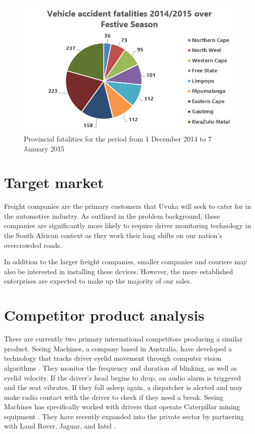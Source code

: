 \begin{figure}[H]
\centering
\includegraphics[width=1\textwidth]{images/provincial_fatalities.PNG}
\vskip10pt
\caption[Provincial fatalities for the period from 1 December 2014 to 7 January 2015]{Provincial fatalities for the period from 1 December 2014 to 7 January 2015}
\label{fig:festiveSeason}
\end{figure}

\section{Target market}
Freight companies are the primary customers that Uvuka will seek to cater for in the automotive industry. As outlined in the problem background, these companies are significantly more likely to require driver monitoring technology in the South African context as they work their long shifts on our nation's overcrowded roads.

In addition to the larger freight companies, smaller companies and couriers may also be interested in installing these devices. However, the more established enterprises are expected to make up the majority of our sales.

\section{Competitor product analysis}
\label{sec:competitoranalysis}
There are currently two primary international competitors producing a similar product. Seeing Machines, a company based in Australia, have developed a technology that tracks driver eyelid movement through computer vision algorithms \cite{SeeingMachinesWebsite}. They monitor the frequency and duration of blinking, as well as eyelid velocity. If the driver’s head begins to drop, an audio alarm is triggered and the seat vibrates. If they fall asleep again, a dispatcher is alerted and may make radio contact with the driver to check if they need a break. Seeing Machines has specifically worked with drivers that operate Caterpillar mining equipment \cite{SeeingMachinesWired}. They have recently expanded into the private sector by partnering with Land Rover, Jaguar, and Intel \cite{sm_similarities}.

